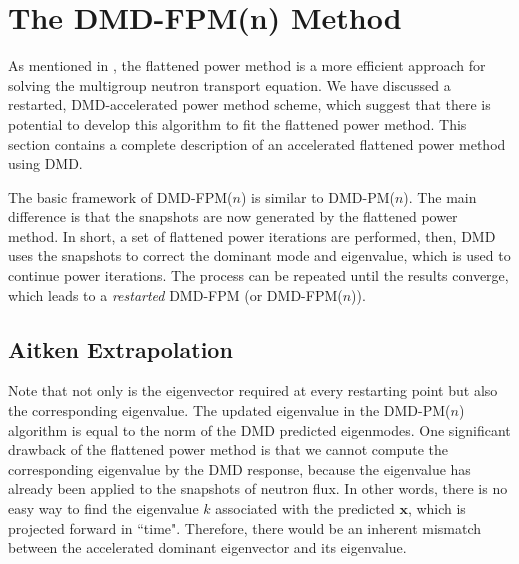 \section{The DMD-FPM(n) Method}

As mentioned in , the flattened power method is a more efficient approach for solving the multigroup neutron transport equation.
We have discussed a restarted, DMD-accelerated power method scheme, which suggest that there is potential to develop this algorithm to fit the flattened power method.
This section contains a complete description of an accelerated flattened power method using DMD.

The basic framework of DMD-FPM($n$) is similar to DMD-PM($n$).
The main difference is that the snapshots are now generated by the flattened power method.
In short, a set of flattened power iterations are performed, then, DMD uses the snapshots to correct the dominant mode and eigenvalue, which is used to continue power iterations.
The process can be repeated until the results converge, which leads to a {\it restarted} DMD-FPM (or DMD-FPM($n$)).

\subsection{Aitken Extrapolation}
Note that not only is the eigenvector required at every restarting point but also the corresponding eigenvalue.
The updated eigenvalue in the DMD-PM($n$) algorithm is equal to the norm of the DMD predicted eigenmodes. 
One significant drawback of the flattened power method is that we cannot compute the corresponding eigenvalue by the DMD response, because the eigenvalue has already been applied to the snapshots of neutron flux.
In other words, there is no easy way to find the eigenvalue $k$ associated with the predicted $\mathbf{x}$, which is projected forward in ``time".
Therefore, there would be an inherent mismatch between the accelerated dominant eigenvector and its eigenvalue.

